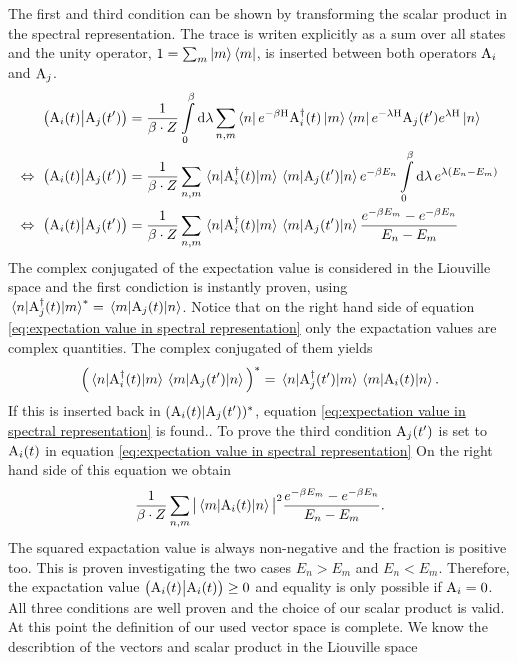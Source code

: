 %
The first and third condition can be shown by transforming the scalar product in the spectral representation.
The trace is writen explicitly as a sum over all states and the unity operator, $1 = \sum_{m} \ket{m} \bra{m}$, is inserted between both operators $\mathrm{A}_{i}$ and $\mathrm{A}_{j}$. 
%
\begin{align}
	\big({\mathrm{A}_{i}(t)}\big|{\mathrm{A}_{j}(t')}\big) &= \frac{1}{\beta \cdot Z} \int\limits_{0}^{\beta} \dd{\lambda} \sum\limits_{n,m} \bra{n} e^{-\beta \mathrm{H}} \mathrm{A}_{i}^{\dag}(t) \ket{m} \bra{m} e^{-\lambda \mathrm{H}} \mathrm{A}_{j}(t') e^{\lambda \mathrm{H}} \ket{n}
	\notag \\
	\Leftrightarrow\ \big({\mathrm{A}_{i}(t)}\big|{\mathrm{A}_{j}(t')}\big) &= \frac{1}{\beta \cdot Z} \sum\limits_{n,m} \mel{n}{\mathrm{A}_{i}^{\dag}(t)}{m} \mel{m}{\mathrm{A}_{j}(t')}{n} e^{-\beta E_{n}} \int\limits_{0}^{\beta} \dd{\lambda} e^{\lambda (E_{n}-E_{m})} 
	\notag \\
	\Leftrightarrow\ \big({\mathrm{A}_{i}(t)}\big|{\mathrm{A}_{j}(t')}\big) &= \frac{1}{\beta \cdot Z} \sum\limits_{n,m} \mel{n}{\mathrm{A}_{i}^{\dag}(t)}{m} \mel{m}{\mathrm{A}_{j}(t')}{n}  \frac{e^{-\beta E_{m}} - e^{-\beta E_{n}}}{E_{n}-E_{m}}
	\label{eq:expectation value in spectral representation}
\end{align}
%
The complex conjugated of the expectation value is considered in the Liouville space and the first condiction is instantly proven, using $\mel{n}{\mathrm{A}_{j}^{\dag}(t)}{m}^{*} = \mel{m}{\mathrm{A}_{j}(t)}{n}$.
Notice that on the right hand side of equation \eqref{eq:expectation value in spectral representation} only the expactation values are complex quantities.
The complex conjugated of them yields
%
\begin{align}
	\Big(\mel{n}{\mathrm{A}_{i}^{\dag}(t)}{m} \mel{m}{\mathrm{A}_{j}(t')}{n}\Big)^{*} = \mel{n}{\mathrm{A}_{j}^{\dag}(t')}{m} \mel{m}{\mathrm{A}_{i}(t)}{n}.
\end{align}
%
If this is inserted back in $({\mathrm{A}_{i}(t)}|{\mathrm{A}_{j}(t')})^{*}$, equation \eqref{eq:expectation value in spectral representation} is found..
To prove the third condition $\mathrm{A}_{j}(t')$ is set to $\mathrm{A}_{i}(t)$ in equation \eqref{eq:expectation value in spectral representation}
On the right hand side of this equation we obtain
%
\begin{align}
	\frac{1}{\beta \cdot Z} \sum\limits_{n,m} \big\vert\mel{m}{\mathrm{A}_{i}(t)}{n}\big\vert^{2} \frac{e^{-\beta E_{m}} - e^{-\beta E_{n}}}{E_{n}-E_{m}}.
\end{align}
%
The squared expactation value is always non-negative and the fraction is positive too.
This is proven investigating the two cases $E_{n} > E_{m}$ and $E_{n} < E_{m}$.
Therefore, the expactation value $\big({\mathrm{A}_{i}(t)}\big|{\mathrm{A}_{i}(t)}\big) \geq 0$ and equality is only possible if $\mathrm{A}_{i} = 0$.
All three conditions are well proven and the choice of our scalar product is valid.
At this point the definition of our used vector space is complete.
We know the describtion of the vectors and scalar product in the Liouville space

